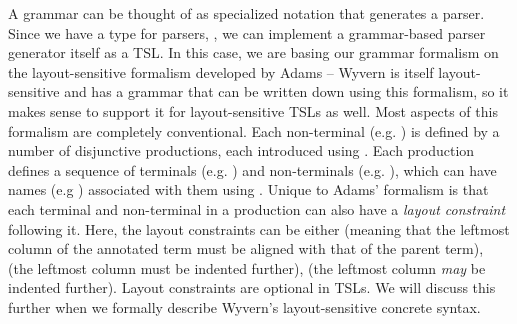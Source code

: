 A grammar can be thought of as specialized notation that generates a parser. Since we have a type for parsers, , we can implement a grammar-based parser generator  itself  as a TSL. In this case, we are basing our grammar formalism on the layout-sensitive formalism developed by Adams \cite{Adams:2013:PPI:2429069.2429129} -- Wyvern is itself layout-sensitive and has a grammar that can be written down using this formalism, so it makes sense to support it for layout-sensitive TSLs as well. Most aspects of this formalism are completely conventional. 
Each non-terminal (e.g. ) is defined by a number of disjunctive productions, each introduced using \li{->}. Each production defines a sequence of terminals (e.g. ) and non-terminals (e.g. ), which can have names (e.g ) associated with them using \li{::}. Unique to Adams' formalism is that each terminal and non-terminal in a production can also have a \emph{layout constraint} following it. Here, the layout constraints can be either \li{=} (meaning that the leftmost column of the annotated term must be aligned with that of the parent term), \li{>} (the leftmost column must be indented further), \li{>=} (the leftmost column \emph{may} be indented further). Layout constraints are optional in TSLs. We will discuss this further when we formally describe Wyvern's layout-sensitive concrete syntax.

